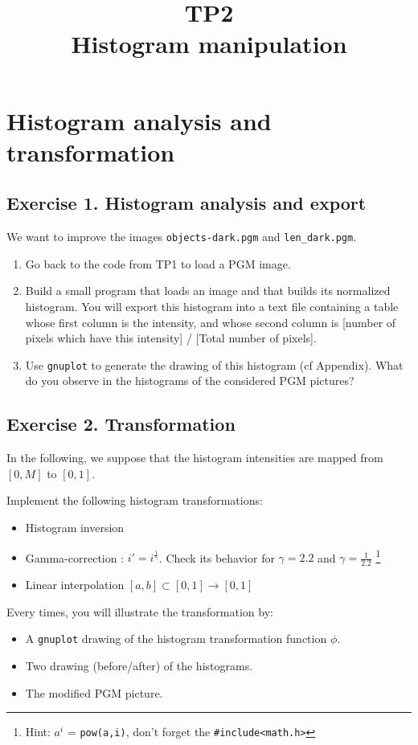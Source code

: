 \documentclass[a4paper, 11pt]{article}
\title{\bf{TP2 \\ Histogram manipulation}}
\author{}
\date{}
\begin{document}
\maketitle

\section*{\bf Histogram analysis and transformation}

\subsection*{\bf Exercise 1. \rm Histogram analysis and export}

\par We want to improve the images \texttt{objects-dark.pgm} and \texttt{len\_dark.pgm}.

\begin{enumerate}
	\item Go back to the code from TP1 to load a PGM image.
	\item Build a small program that loads an image and that builds its normalized histogram. You will export this histogram into a text file containing a table whose first column is the intensity, and whose second column is [number of pixels which have this intensity] / [Total number of pixels].
	\item Use \texttt{gnuplot} to generate the drawing of this histogram (cf Appendix). What do you observe in the histograms of the considered PGM pictures?
\end{enumerate}

\subsection*{\bf Exercise 2. \rm Transformation}

In the following, we suppose that the histogram intensities are mapped from $[0,M]$  to $[0,1]$.

\par Implement the following histogram transformations: 
	\begin{itemize}
		\item Histogram inversion
		\item Gamma-correction :  $i' = i^\frac{1}{\gamma}$. Check its behavior for $\gamma=2.2$ and $\gamma=\frac{1}{2.2}$ \footnote{Hint: $a^i$ = \texttt{pow(a,i)}, don't forget the \texttt{\#include<math.h>}}
		\item Linear interpolation $[a,b]\subset[0,1]\rightarrow [0,1]$
	\end{itemize}
Every times, you will illustrate the transformation by:
\begin{itemize}
	\item A \texttt{gnuplot} drawing of the histogram transformation function $\phi$.
	\item Two drawing (before/after) of the histograms.
	\item The modified PGM picture.
\end{itemize}
\end{document}
